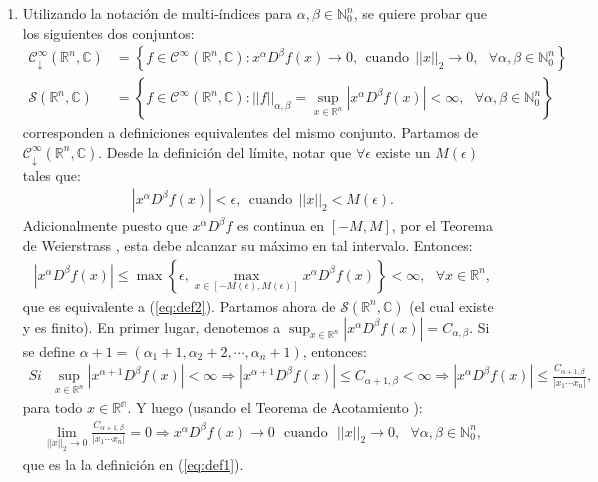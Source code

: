\documentclass[spanish, fleqn]{article}
\begin{document}
\begin{description}
\begin{enumerate}
        \item Utilizando la notación de multi-índices para $\alpha,\beta \in \mathbb{N}_0^n$, se quiere probar que los siguientes dos conjuntos:
        \begin{align}
            \mathcal{C}_{\downarrow}^{\infty}(\mathbb{R}^n,\mathbb{C}) &= \left\{ f \in \mathcal{C}^{\infty}(\mathbb{R}^n,\mathbb{C}): x^{\alpha} D^{\beta} f(x) \rightarrow 0, \ \ \text{cuando} \ \ ||x||_2 \rightarrow 0, \ \ \ \forall \alpha,\beta \in \mathbb{N}_0^n \right\} \label{eq:def1} \\
            \mathcal{S}(\mathbb{R}^n,\mathbb{C}) &= \left\{ f \in \mathcal{C}^{\infty}(\mathbb{R}^n,\mathbb{C}): ||f ||_{\alpha, \beta} = \sup_{x \in \mathbb{R}^n} \left|x^{\alpha} D^{\beta} f(x)\right| < \infty, \ \ \ \forall \alpha,\beta \in \mathbb{N}_0^n \right\} \label{eq:def2}
        \end{align}
        corresponden a definiciones equivalentes del mismo conjunto. Partamos de $\mathcal{C}_{\downarrow}^{\infty}(\mathbb{R}^n,\mathbb{C})$. Desde la definición del límite, notar que $\forall \epsilon$ existe un $M(\epsilon)$ tales que:
        \begin{align*}
            | x^{\alpha} D^{\beta} f(x)| < \epsilon, \ \ \text{cuando} \ \ ||x||_2 < M(\epsilon).
        \end{align*}
        Adicionalmente puesto que  $x^{\alpha} D^{\beta} f$ es continua en $[-M,M]$, por el Teorema de Weierstrass \cite{Weier}, esta debe alcanzar su máximo en tal intervalo. Entonces:
        \begin{align*}
            |x^{\alpha} D^{\beta} f(x)| \leq \max \left\{ \epsilon, \max_{x\in [-M(\epsilon),M(\epsilon)]} x^{\alpha} D^{\beta} f(x) \right\} < \infty, \ \ \ \forall x \in \mathbb{R}^n,
        \end{align*}
        que es equivalente a (\ref{eq:def2}). Partamos ahora de $\mathcal{S}(\mathbb{R}^n,\mathbb{C})$ (el cual existe y es finito). En primer lugar, denotemos a $\displaystyle \sup_{x \in \mathbb{R}^n} \left|x^{\alpha} D^{\beta} f(x)\right| = C_{\alpha,\beta}$. Si se define $\alpha+1 =(\alpha_1+1, \alpha_2+2, \cdots, \alpha_n+1)$, entonces:
        \begin{align*}
            {Si} \ \ \  \sup_{x \in \mathbb{R}^n} \left|x^{\alpha+1} D^{\beta} f(x)\right| < \infty
            \Rightarrow \left|x^{\alpha+1} D^{\beta} f(x)\right| \leq C_{\alpha+1,\beta} < \infty
            \Rightarrow  \left|x^{\alpha} D^{\beta} f(x)\right| \leq \frac{C_{\alpha+1,\beta}}{|x_1 \cdots x_n|},
        \end{align*}
        para todo $x \in \mathbb{R^n}$. Y luego (usando el Teorema de Acotamiento \cite{Squeeze}):
        \begin{align*}
            \lim_{||x||_2 \rightarrow 0} \frac{C_{\alpha+1,\beta}}{|x_1 \cdots x_n|} = 0 \Longrightarrow x^{\alpha} D^{\beta} f(x)\rightarrow 0 \ \ \ \text{cuando} \ \ \ ||x||_2\rightarrow 0,  \ \ \ \forall \alpha,\beta \in \mathbb{N}_0^n,
        \end{align*}
        que es la la definición en (\ref{eq:def1}).


\end{enumerate}
\end{description}
\end{document}
